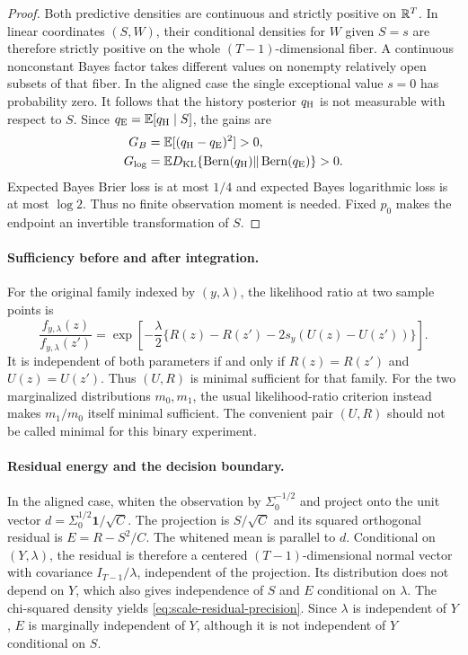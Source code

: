 \begin{proof}
Both predictive densities are continuous and strictly positive on $\mathbb R^T$.
In linear coordinates $(S,W)$, their conditional densities for $W$ given
$S=s$ are therefore strictly positive on the whole $(T-1)$-dimensional
fiber. A continuous nonconstant Bayes factor takes different values on
nonempty relatively open subsets of that fiber. In the aligned case the
single exceptional value $s=0$ has probability zero. It follows that the
history posterior $q_{\rm H}$ is not measurable with respect to $S$.
Since $q_{\rm E}=\mathbb E[q_{\rm H}\mid S]$, the gains are
\begin{align*}
 G_B&=\mathbb E[(q_{\rm H}-q_{\rm E})^2]>0,\\
 G_{\log}&=\mathbb ED_{\mathrm{KL}}\{\operatorname{Bern}(q_{\rm H})
                  \|\operatorname{Bern}(q_{\rm E})\}>0.
\end{align*}
Expected Bayes Brier loss is at most $1/4$ and expected Bayes logarithmic
loss is at most $\log2$. Thus no finite observation moment is needed.
Fixed $p_0$ makes the endpoint an invertible transformation of $S$.
\end{proof}

\paragraph{Sufficiency before and after integration.}
For the original family indexed by $(y,\lambda)$, the likelihood ratio at
two sample points is
\[
 \frac{f_{y,\lambda}(z)}{f_{y,\lambda}(z')}
 =\exp\left[-\frac\lambda2
    \{R(z)-R(z')-2s_y(U(z)-U(z'))\}\right].
\]
It is independent of both parameters if and only if $R(z)=R(z')$ and
$U(z)=U(z')$. Thus $(U,R)$ is minimal sufficient for that family.
For the two marginalized distributions $m_0,m_1$, the usual likelihood-ratio
criterion instead makes $m_1/m_0$ itself minimal sufficient. The convenient
pair $(U,R)$ should not be called minimal for this binary experiment.

\paragraph{Residual energy and the decision boundary.}
In the aligned case, whiten the observation by $\Sigma_0^{-1/2}$ and
project onto the unit vector
$d=\Sigma_0^{1/2}\boldsymbol1/\sqrt C$. The projection is $S/\sqrt C$
and its squared orthogonal residual is $E=R-S^2/C$. The whitened mean is
parallel to $d$. Conditional on $(Y,\lambda)$, the residual is therefore
a centered $(T-1)$-dimensional normal vector with covariance
$I_{T-1}/\lambda$, independent of the projection. Its distribution does
not depend on $Y$, which also gives independence of $S$ and $E$ conditional
on $\lambda$. The chi-squared density yields
\eqref{eq:scale-residual-precision}. Since $\lambda$ is independent of $Y$,
$E$ is marginally independent of $Y$, although it is not independent of
$Y$ conditional on $S$.

